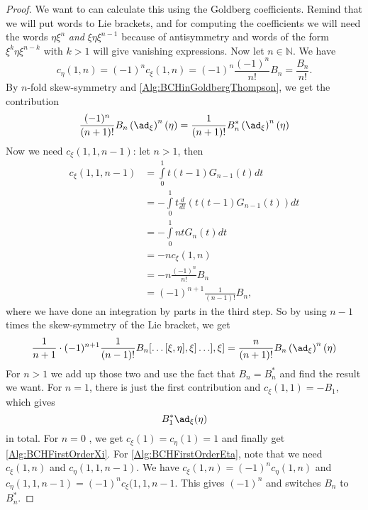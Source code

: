 \begin{proof}
	We want to can calculate this using the Goldberg coefficients. Remind that 
	we will put words to Lie brackets, and for computing the coefficients we 
	will need the words $\eta \xi^n$ \emph{and} $\xi \eta \xi^{n-1}$ because 
	of antisymmetry and words of the form $\xi^k \eta \xi^{n-k}$ with $k > 1$ 
	will give vanishing expressions. Now let $n \in \mathbb{N}$. We have
	\begin{equation*}
		c_{\eta}(1,n) 
		= 
		(-1)^n c_{\xi}(1,n) 
		= 
		(-1)^n 
		\frac{(-1)^n}{n!} 
		B_n 
		= 
		\frac{B_n}{n!}.
	\end{equation*}
	By $n$-fold skew-symmetry and \eqref{Alg:BCHinGoldbergThompson}, we get 
	the contribution
	\begin{equation*}
		\frac{(-1)^n}{(n+1)!} 
		B_n \left( \ad_{\xi} \right)^n (\eta)
		=
		\frac{1}{(n+1)!} 
		B_n^* \left( \ad_{\xi} \right)^n (\eta)		
	\end{equation*}
	Now we need $c_{\xi}(1, 1, n-1)$: let $n > 1$, then
	\begin{align*}
		c_{\xi}(1, 1, n - 1) 
		& = 
		\int\limits_0^1 
		t(t-1) G_{n-1}(t) 
		dt 
		\\
		& = 
		- \int\limits_0^1 
		t \frac{d}{dt} 
		\left( t(t-1) G_{n-1}(t) \right) 
		dt 
		\\
		& =
		- \int\limits_0^1 
		n t G_n(t) 
		dt 
		\\
		& = 
		-n 
		c_{\xi}(1,n) 
		\\
		& = 
		-n 
		\frac{(-1)^n}{n!} 
		B_n 
		\\
		& =  
		(-1)^{n + 1} 
		\frac{1}{(n-1)!} B_n,
	\end{align*}
	where we have done an integration by parts in the third step.
	So by using $n-1$ times the skew-symmetry of the Lie bracket, we get
	\begin{equation*}
		\frac{1}{n + 1} 
		\cdot (-1)^{n + 1} 
		\frac{1}{ (n - 1)! }
		B_n 
		[\ldots [\xi, \eta], \xi] \ldots ], \xi] 
		= 
		\frac{n}{(n+1)!} 
		B_n 
		\left( \ad_{\xi} \right)^n (\eta)
	\end{equation*}
	For $n > 1$ we add up those two and use the fact that $B_n = B_n^*$ and 
	find the result we want. For $n = 1$, there is just the first contribution 
	and $c_{\xi}(1,1) = - B_1$, which gives
	\begin{equation*}
		B_1^* \ad_{\xi}(\eta)
	\end{equation*}
	in total. For $n = 0$ , we get $c_{\xi}(1) = c_{\eta}(1) = 1$ and finally 
	get \eqref{Alg:BCHFirstOrderXi}. For \eqref{Alg:BCHFirstOrderEta}, note 
	that we need $c_{\xi}(1, n)$ and $c_{\eta}(1, 1, n-1)$. We have 
	$c_{\xi}(1,n) = (-1)^n c_{\eta}(1,n)$ and 
	$c_{\eta}(1, 1, n-1) = (-1)^n c_{\xi}(1,1,n-1$.
	This gives $(-1)^n$ and switches $B_n$ to $B_n^*$.
\end{proof}
